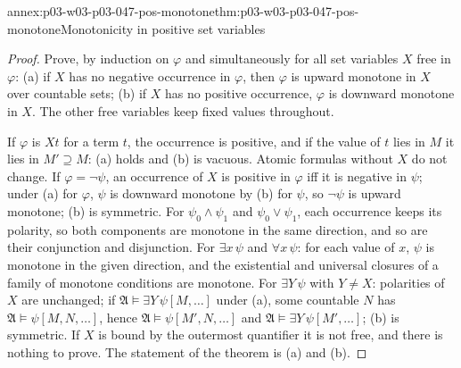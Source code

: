 \begin{annexitem}{annex:p03-w03-p03-047-pos-monotone}{thm:p03-w03-p03-047-pos-monotone}{Monotonicity in positive set variables}
\begin{proof}
Prove, by induction on \(\varphi\) and simultaneously for all set variables
\(X\) free in \(\varphi\): (a) if \(X\) has no negative occurrence in
\(\varphi\), then \(\varphi\) is upward monotone in \(X\) over countable
sets; (b) if \(X\) has no positive occurrence, \(\varphi\) is downward
monotone in \(X\).  The other free variables keep fixed values throughout.

If \(\varphi\) is \(Xt\) for a term \(t\), the
occurrence is positive, and if the value of \(t\) lies in \(M\) it lies in
\(M'\supseteq M\): (a) holds and (b) is vacuous.  Atomic formulas without
\(X\) do not change.  If \(\varphi=\neg\psi\), an occurrence of \(X\) is
positive in \(\varphi\) iff it is negative in \(\psi\); under (a) for
\(\varphi\), \(\psi\) is downward monotone by (b) for \(\psi\), so
\(\neg\psi\) is upward monotone; (b) is symmetric.  For \(\psi_0\land\psi_1\)
and \(\psi_0\lor\psi_1\), each occurrence keeps its polarity, so both
components are monotone in the same direction, and so are their conjunction
and disjunction.  For \(\exists x\,\psi\) and \(\forall x\,\psi\): for each
value of \(x\), \(\psi\) is monotone in the given direction, and the
existential and universal closures of a family of monotone conditions are
monotone.  For \(\exists Y\,\psi\) with \(Y\ne X\): polarities of \(X\) are
unchanged; if \(\mathfrak A\models\exists Y\,\psi[M,\ldots]\) under (a), some
countable \(N\) has \(\mathfrak A\models\psi[M,N,\ldots]\), hence
\(\mathfrak A\models\psi[M',N,\ldots]\) and
\(\mathfrak A\models\exists Y\,\psi[M',\ldots]\); (b) is symmetric.  If
\(X\) is bound by the outermost quantifier it is not free, and there is
nothing to prove.  The statement of the theorem is (a) and (b).
\end{proof}
\end{annexitem}

